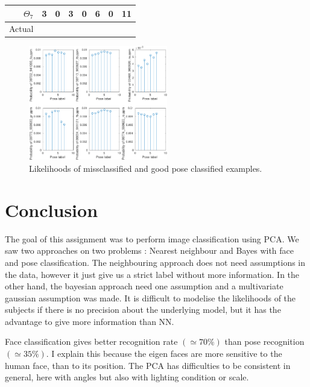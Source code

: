 \documentclass[runningheads,a4paper]{llncs}
\begin{document}
\begin{table}
\begin{tabular}{@{}r|ccccccc@{}}
$\Theta_7$ & 3                              & 0                              & 3                              & 0                              & 6                              & 0                              & 11                             \\ \midrule
Actual     & \multicolumn{1}{l}{}           & \multicolumn{1}{l}{}           & \multicolumn{1}{l}{}           & \multicolumn{1}{l}{}           & \multicolumn{1}{l}{}           & \multicolumn{1}{l}{}           & \multicolumn{1}{l}{}           \\ \cmidrule(r){1-1}
\end{tabular}
\end{table}

\begin{figure}
\centering
\includegraphics[height=5cm]{Figures/proba_eig_pose}
\caption{Likelihoods of missclassified and good pose classified examples.}
\label{fig:proba_eig_pose}
\end{figure}

\section{Conclusion}

The goal of this assignment was to perform image classification using PCA. We saw two approaches on two problems : Nearest neighbour and Bayes with face and pose classification. 
The neighbouring approach does not need assumptions in the data, however it just give us a strict label without more information. In the other hand, the bayesian approach need one assumption and a multivariate gaussian assumption was made. It is difficult to modelise the likelihoods of the subjects if there is no precision about the underlying model, but it has the advantage to give more information than NN. \par
Face classification gives better recognition rate $(\simeq 70\%)$ than pose recognition $(\simeq 35\%)$. I explain this because the eigen faces are more sensitive to the human face, than to its position. The PCA has difficulties to be consistent in general, here with angles but also with lighting condition or scale.

{\small


}
\end{document}
